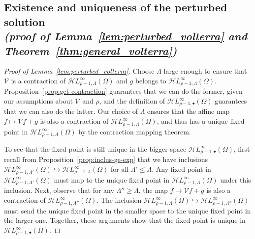 \documentclass{article}
\theoremstyle{plain}
\newcommand{\singexp}[2]{\mathcal{H}L^\infty_{#1, #2}}
\newcommand{\singexpalg}[1]{\singexp{#1}{\bullet}}
\newcommand{\volterra}{\mathcal{V}}
\begin{document}
\subsection{Existence and uniqueness of the perturbed solution \\ \textit{(proof of Lemma~\ref{lem:perturbed_volterra} and Theorem~\ref{thm:general_volterra})}}\label{sec:existence and uniqueness}
\begin{proof}[Proof of Lemma~\ref{lem:perturbed_volterra}]
Choose $\Lambda$ large enough to ensure that $\volterra$ is a contraction of $\singexp{\rho-1}{\Lambda}(\Omega)$ and $g$ belongs to $\singexp{\rho-1}{\Lambda}(\Omega)$. Proposition~\ref{prop:get-contraction} guarantees that we can do the former, given our assumptions about $\volterra$ and $\rho$, and the definition of $\singexpalg{\rho-1}(\Omega)$ guarantees that we can also do the latter. Our choice of $\Lambda$ ensures that the affine map $f \mapsto \volterra f + g$ is also a contraction of $\singexp{\rho-1}{\Lambda}(\Omega)$, and thus has a unique fixed point in $\singexp{\rho-1}{\Lambda}(\Omega)$ by the contraction mapping theorem.

To see that the fixed point is still unique in the bigger space $\singexpalg{\rho-1}(\Omega)$, first recall from Proposition~\ref{prop:inclus-ge-exp} that we have inclusions $\singexp{\rho-1}{\Lambda'}(\Omega) \hookrightarrow \singexp{\rho-1}{\Lambda}(\Omega)$ for all $\Lambda' \le \Lambda$. Any fixed point in $\singexp{\rho-1}{\Lambda'}(\Omega)$ must map to the unique fixed point in $\singexp{\rho-1}{\Lambda}(\Omega)$ under this inclusion. Next, observe that for any $\Lambda'' \ge \Lambda$, the map $f \mapsto \volterra f + g$ is also a contraction of $\singexp{\rho-1}{\Lambda''}(\Omega)$. The inclusion $\singexp{\rho-1}{\Lambda}(\Omega) \hookrightarrow \singexp{\rho-1}{\Lambda''}(\Omega)$ must send the unique fixed point in the smaller space to the unique fixed point in the larger one. Together, these arguments show that the fixed point is unique in $\singexpalg{\rho-1}(\Omega)$.
\end{proof}
\end{document}
